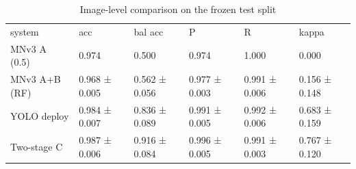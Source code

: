 \begin{table}[t]\centering\small\caption{Image-level comparison on the frozen test split}
\label{tab:t3imagelevel}
\begin{tabular}{|llllll|}\hline
system & acc & bal acc & P & R & kappa\\
MNv3 A (0.5) & 0.974 & 0.500 & 0.974 & 1.000 & 0.000\\
MNv3 A+B (RF) & 0.968 ± 0.005 & 0.562 ± 0.056 & 0.977 ± 0.003 & 0.991 ± 0.006 & 0.156 ± 0.148\\
YOLO deploy & 0.984 ± 0.007 & 0.836 ± 0.089 & 0.991 ± 0.005 & 0.992 ± 0.006 & 0.683 ± 0.159\\
Two-stage C & 0.987 ± 0.006 & 0.916 ± 0.084 & 0.996 ± 0.005 & 0.991 ± 0.003 & 0.767 ± 0.120\\
\hline\end{tabular}\end{table}
